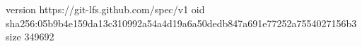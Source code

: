 version https://git-lfs.github.com/spec/v1
oid sha256:05b9b4e159da13c310992a54a4d19a6a50dedb847a691e77252a7554027156b3
size 349692
